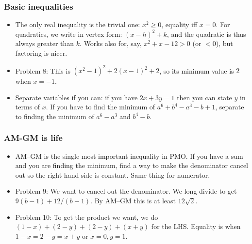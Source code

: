 \documentclass[10pt,paper=letter]{scrartcl}
\begin{document}
\subsubsection*{Basic inequalities}

\begin{itemize}
  \item The only real inequality is the trivial one: $x^2 \geq 0$, equality iff $x = 0$. For quadratics, we write in vertex form: $(x - h)^2 + k$, and the quadratic is thus always greater than $k$. Works also for, say, $x^2 + x - 12 > 0$ (or $ < 0$), but factoring is nicer.
  \item Problem 8: This is $(x^2 - 1)^2 + 2(x - 1)^2 + 2$, so its minimum value is $2$ when $x = -1$.
  \item Separate variables if you can: if you have $2x + 3y = 1$ then you can state $y$ in terms of $x$. If you have to find the minimum of $a^6 + b^4 - a^3 - b + 1$, separate to finding the minimum of $a^6 - a^3$ and $b^4 - b$.
\end{itemize}

\subsubsection*{AM-GM is life}

\begin{itemize}
  \item AM--GM is the single most important inequality in PMO. If you have a sum and you are finding the minimum, find a way to make the denominator cancel out so the right-hand-side is constant. Same thing for numerator.
  \item Problem 9: We want to cancel out the denominator. We long divide to get $9(b-1) + 12/(b-1)$. By AM--GM this is at least $12\sqrt2$.
  \item Problem 10: To get the product we want, we do $(1-x) + (2-y) + (2-y) + (x+y)$ for the LHS. Equality is when $1-x = 2-y = x+y$ or $x = 0, y = 1$. 
\end{itemize}
\end{document}
